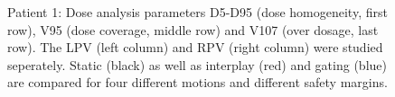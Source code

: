 \documentclass[type=dr, dr=rernat, accentcolor=tud7b,colorbacktitle, bigchapter, openright, twoside, 12pt ]{tudthesis}
\begin{document}
\begin{figure}[H]
{ }
\caption{Patient 1: Dose analysis parameters D5-D95 (dose homogeneity, first row), V95 (dose coverage, middle row) and V107 (over dosage, last row). 
The LPV (left column) and RPV (right column) were studied seperately. Static (black) as well as interplay (red) and gating (blue) 
are compared for four different motions and different safety margins.}
\label{static_interplay_gating_Pat01}
\end{figure}
\end{document}
